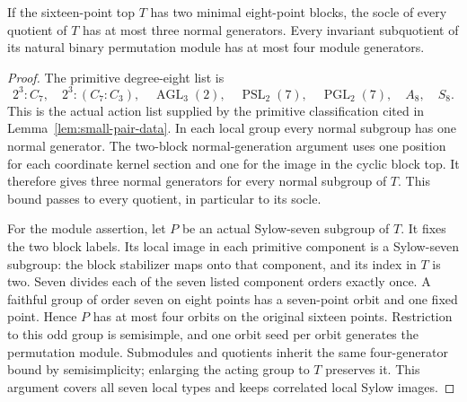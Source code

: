 \begin{lemma}
\label{lem:two-eight-blocks}
If the sixteen-point top $T$ has two minimal eight-point blocks,
the socle of every quotient of $T$ has at most three normal
generators. Every invariant subquotient of its natural binary
permutation module has at most four module generators.
\end{lemma}
\begin{proof}
The primitive degree-eight list is
\[
 2^3:C_7,\quad 2^3:(C_7:C_3),\quad \operatorname{AGL}_3(2),\quad
 \operatorname{PSL}_2(7),\quad\operatorname{PGL}_2(7),\quad A_8,\quad S_8.
\]
This is the actual action list supplied by the primitive classification
cited in Lemma~\ref{lem:small-pair-data}. In each local group every normal
subgroup has one normal generator. The two-block normal-generation
argument uses one position for each coordinate kernel section and one
for the image in the cyclic block top. It therefore gives three
normal generators for every normal subgroup of $T$. This bound passes
to every quotient, in particular to its socle.

For the module assertion, let $P$ be an actual Sylow-seven subgroup
of $T$. It fixes the two block labels. Its local image in each
primitive component is a Sylow-seven subgroup: the block stabilizer
maps onto that component, and its index in $T$ is two. Seven divides
each of the seven listed component orders exactly once. A faithful
group of order seven on eight points has a seven-point orbit and one
fixed point. Hence $P$ has at most four orbits on the original sixteen
points. Restriction to this odd group is semisimple, and one orbit
seed per orbit generates the permutation module. Submodules and
quotients inherit the same four-generator bound by semisimplicity;
enlarging the acting group to $T$ preserves it. This argument covers
all seven local types and keeps correlated local Sylow images.
\end{proof}

